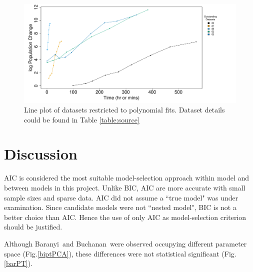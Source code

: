 \documentclass[a4paper, 11pt]{article}
\newcommand{\fba}{Baranyi}
\newcommand{\fbu}{Buchanan}
\begin{document}
 \begin{figure}[H]
 	\centering
 	\includegraphics[width=\linewidth]{../results/Log_outstanding.pdf}
 	\caption{Line plot of datasets restricted to polynomial fits. Dataset details could be found in Table \ref{table:source}}\label{lineOut}
 \end{figure}
	
	\section*{Discussion}
	
	AIC is considered the most suitable model-selection approach within model and between models in this project.  Unlike BIC, AIC are more accurate with small sample sizes\autocite{acquah2010comparison,kuha2004aic} and sparse data\autocite{kuha2004aic}.  AIC did not assume a ``true model" was under examination\autocite{aho2014model,vrieze2012model,yang2005can}.  Since candidate models were not ``nested model", BIC is not a better choice than AIC\autocite{wang2006comparison}.  Hence the use of only AIC as model-selection criterion should be justified.
	
	Although \fba\ and \fbu\ were observed occupying different parameter space (Fig.\ref{biptPCA}), these differences were not statistical significant (Fig.\ref{barPT}).
	
\end{document}
